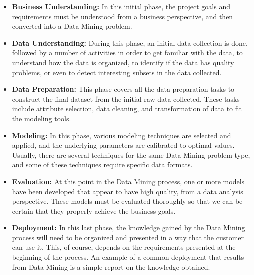 \begin{itemize}
    \setlength\itemsep{1em}

    \item\textbf{Business Understanding:} In this initial phase, the project goals and requirements must be understood from a business perspective, and then converted into a Data Mining problem.

    \item\textbf{Data Understanding:} During this phase, an initial data collection is done, followed by a number of activities in order to get familiar with the data, to understand how the data is organized, to identify if the data has quality problems, or even to detect interesting subsets in the data collected.

    \item\textbf{Data Preparation:} This phase covers all the data preparation tasks to construct the final dataset from the initial raw data collected. These tasks include attribute selection, data cleaning, and transformation of data to fit the modeling tools.

    \item\textbf{Modeling:} In this phase, various modeling techniques are selected and applied, and the underlying parameters are calibrated to optimal values. Usually, there are several techniques for the same Data Mining problem type, and some of these techniques require specific data formats.

    \item\textbf{Evaluation:} At this point in the Data Mining process, one or more models have been developed that appear to have high quality, from a data analysis perspective. These models must be evaluated thoroughly so that we can be certain that they properly achieve the business goals.

    \item\textbf{Deployment:} In this last phase, the knowledge gained by the Data Mining process will need to be organized and presented in a way that the customer can use it. This, of course, depends on the requirements presented at the beginning of the process. An example of a common deployment that results from Data Mining is a simple report on the knowledge obtained. 

\end{itemize}

